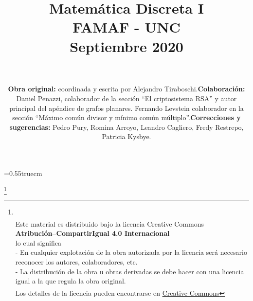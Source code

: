 \documentclass[a4paper,12pt,twoside,spanish,reqno]{amsbook}
\theoremstyle{definition}
\theoremstyle{remark}
\begin{document}
\baselineskip=0.55truecm %





\title{Matemática Discreta I \\ FAMAF  - UNC \\ Septiembre 2020 }

\maketitle



\author{
${}^{}$
\\${}^{}$
\\${}^{}$
 \\${}^{}$\\ 
\flushleft 
\begin{itemize}
\item \textbf{Obra original:} coordinada y escrita por Alejandro Tiraboschi. 
\item \textbf{Colaboración: } Daniel Penazzi, colaborador  de la sección ``El criptosistema RSA'' y autor principal del apéndice de grafos planares. Fernando Levstein colaborador en la sección ``Máximo común divisor y mínimo común múltiplo''.   
\item \textbf{Correcciones y sugerencias:} Pedro Pury, Romina Arroyo, Leandro Cagliero, Fredy Restrepo, Patricia Kysbye. 
\end{itemize}
}









\vskip 2cm 
\thanks{
 \\
${}^{}$\\
{\flushleft 
Este material es distribuido bajo la licencia Creative Commons} \\
{\center \textbf{Atribución--CompartirIgual 4.0 Internacional}}
\\ 
\center  lo cual significa 
\\
\flushleft
 - En cualquier explotación de la obra autorizada por la licencia será necesario reconocer los autores, colaboradores, etc.\\
 - La distribución de la obra u obras derivadas se debe hacer con una licencia igual a la que regula la obra original.\\
${}^{}$
\\
Los detalles de la licencia pueden encontrarse en \href{https://creativecommons.org/licenses/by/4.0/deed.es}{Creative Commons}
}
\end{document}
